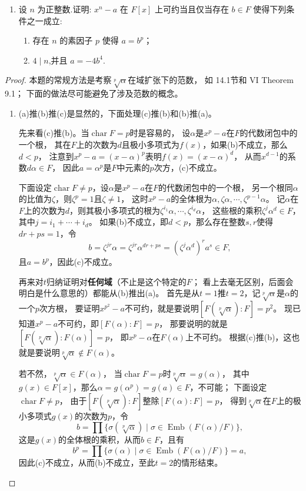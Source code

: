 \begin{enumerate}
\begin{enumerate}[label=(\arabic*)]
    \item 设 $ n $ 为正整数.证明: $ x^n - a $ 在 $ F[x] $ 上可约当且仅当存在 $ b \in F $ 使得下列条件之一成立:
    \begin{enumerate}[label=(\alph*)]
        \item 存在 $ n $ 的素因子 $ p $ 使得 $ a = b^p $；
        \item $ 4 \mid n $,并且 $ a = -4b^4 $.
    \end{enumerate}
\end{enumerate}
\begin{proof}
本题的常规方法是考察$\sqrt[p]{\alpha}$在域扩张下的范数，
如\cite{Ro} 14.1节和\cite{La} VI Theorem 9.1；
下面的做法尽可能避免了涉及范数的概念。
\begin{enumerate}[label=(\arabic*)]
    \item (a)推(b)推(c)是显然的，下面处理(c)推(b)和(b)推(a)。

    先来看(c)推(b)。当$\operatorname{char}F=p$时是容易的，
    设$\alpha$是$x^p-a$在$F$的代数闭包中的一个根，
    其在$F$上的次数为$d$且极小多项式为$f(x)$，如果(b)不成立，那么$d<p$，
    注意到$x^p-a=(x-\alpha)^p$表明$f(x)=(x-\alpha)^d$，
    从而$x^{d-1}$的系数$d\alpha \in F$，
    因此$a=\alpha^p$是$F$中元素的$p$次方，(c)不成立。
    
    下面设定$\operatorname{char}F \ne p$，设$\alpha$是$x^p-a$在$F$的代数闭包中的一个根，
    另一个根同$\alpha$的比值为$\zeta$，则$\zeta^p=1$且$\zeta\ne1$，
    这时$x^p-a$的全体根为$\alpha,\zeta\alpha,\cdots,\zeta^{p-1}\alpha$。
    记$\alpha$在$F$上的次数为$d$，则其极小多项式的根为$\zeta^{i_1}\alpha,\cdots,\zeta^{i_d}\alpha$，
    这些根的乘积$\zeta^j\alpha^d \in F$，其中$j=i_1+\cdots+i_d$。
    如果(b)不成立，即$d<p$，那么存在整数$s,r$使得$dr+ps=1$，令
    \[b=\zeta^{jr}\alpha=\zeta^{jr}\alpha^{dr+ps}=(\zeta^j\alpha^d)^ra^s \in F,\]
    且$a=b^p$，因此(c)不成立。

    再来对$t$归纳证明对\textbf{任何域}（不止是这个特定的$F$；
    看上去毫无区别，后面会明白是什么意思的）都能从(b)推出(a)。
    首先是从$t=1$推$t=2$，记$\sqrt[p]{\alpha}$是$\alpha$的一个$p$次方根，
    要证明$x^{p^2}-a$不可约，就是要说明$[F(\sqrt[p]{\alpha}):F]=p^2$。
    现已知道$x^p-a$不可约，即$[F(\alpha):F]=p$，
    那要说明的就是$[F(\sqrt[p]{\alpha}):F(\alpha)]=p$，
    即$x^p-\alpha$在$F(\alpha)$上不可约。
    根据(c)推(b)，这也就是要说明$\sqrt[p]{\alpha} \notin F(\alpha)$。
    
    若不然，$\sqrt[p]{\alpha} \in F(\alpha)$，
    当$\operatorname{char}F=p$时$\sqrt[p]{\alpha}=g(\alpha)$，
    其中$g(x) \in F[x]$，那么$\alpha=g(\alpha^p)=g(a) \in F$，不可能；
    下面设定$\operatorname{char}F \ne p$，
    由于$[F(\sqrt[p]{\alpha}):F]$整除$[F(\alpha):F]=p$，
    得到$\sqrt[p]{\alpha}$在$F$上的极小多项式$g(x)$的次数为$p$，令
    \[b=\prod\{\sigma(\sqrt[p]{\alpha})\mid\sigma\in\operatorname{Emb}(F(\alpha)/F)\},\]
    这是$g(x)$的全体根的乘积，从而$b \in F$，且有
    \[b^p=\prod\{\sigma(\alpha)\mid\sigma\in\operatorname{Emb}(F(\alpha)/F)\}=a,\]
    因此(c)不成立，从而(b)不成立，至此$t=2$的情形结束。
    

\end{enumerate}
\end{proof}
\end{enumerate}
